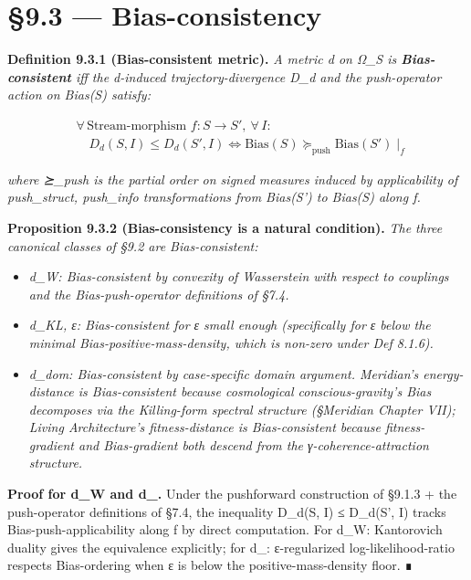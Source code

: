 \documentclass[11pt, openany]{book}
\begin{document}
\section{§9.3 --- Bias-consistency}

\textbf{Definition 9.3.1 (Bias-consistent metric).} \textit{A metric d on Ω\_\allowbreak{}S is \textbf{Bias-consistent} iff the d-induced trajectory-divergence D\_\allowbreak{}d and the push-operator action on Bias(S) satisfy:}

\[
\begin{aligned}
& \forall\, \text{Stream-morphism } f : S \to S',\ \forall\, I: \\
& \quad D_d(S, I) \leq D_d(S', I) \iff \mathrm{Bias}(S) \succeq_\mathrm{push} \mathrm{Bias}(S') \mid_f
\end{aligned}
\]

\textit{where ⪰\_\allowbreak{}push is the partial order on signed measures induced by applicability of push\_\allowbreak{}struct, push\_\allowbreak{}info transformations from Bias(S') to Bias(S) along f.}

\textbf{Proposition 9.3.2 (Bias-consistency is a natural condition).} \textit{The three canonical classes of §9.2 are Bias-consistent:}

\begin{itemize}
\item \textit{d\_\allowbreak{}W: Bias-consistent by convexity of Wasserstein with respect to couplings and the Bias-push-operator definitions of §7.4.}
\item \textit{d\_\allowbreak{}KL, ε: Bias-consistent for ε small enough (specifically for ε below the minimal Bias-positive-mass-density, which is non-zero under Def 8.1.6).}
\item \textit{d\_\allowbreak{}dom: Bias-consistent by case-specific domain argument. Meridian's energy-distance is Bias-consistent because cosmological conscious-gravity's Bias decomposes via the Killing-form spectral structure (§Meridian Chapter VII); Living Architecture's fitness-distance is Bias-consistent because fitness-gradient and Bias-gradient both descend from the γ-coherence-attraction structure.}
\end{itemize}

\textbf{Proof for d\_\allowbreak{}W and d\_.} Under the pushforward construction of §9.1.3 + the push-operator definitions of §7.4, the inequality D\_\allowbreak{}d(S, I) ≤ D\_\allowbreak{}d(S', I) tracks Bias-push-applicability along f by direct computation. For d\_\allowbreak{}W: Kantorovich duality gives the equivalence explicitly; for d\_: ε-regularized log-likelihood-ratio respects Bias-ordering when ε is below the positive-mass-density floor. ∎
\end{document}

